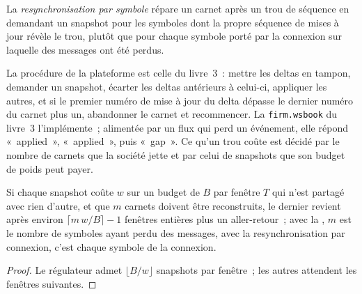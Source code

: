 \begin{definition}\label{def:nw:api-engineering-for-crypto-venues:resync}
La \emph{resynchronisation par symbole} répare un carnet après un trou de séquence en demandant un snapshot pour les symboles dont
la propre séquence de mises à jour révèle le trou, plutôt que pour chaque symbole porté par la connexion sur laquelle des messages ont été perdus.
\end{definition}

La procédure de la plateforme est celle du livre~3~: mettre les deltas en tampon, demander un snapshot, écarter les deltas antérieurs à celui-ci, appliquer les autres, et si le premier numéro de mise à jour
du delta dépasse le dernier numéro du carnet plus un, abandonner le carnet et recommencer. La \texttt{firm.wsbook} du livre~3 l'implémente~; alimentée par un flux qui perd un
événement, elle répond «~applied~», «~applied~», puis «~gap~». Ce qu'un trou coûte est décidé par le nombre de carnets que la société jette et par celui de snapshots que son
budget de poids peut payer.

\begin{proposition}\label{prop:nw:api-engineering-for-crypto-venues:gap}
Si chaque snapshot coûte $w$ sur un budget de $B$ par fenêtre $T$ qui n'est partagé avec rien d'autre, et que $m$ carnets doivent être reconstruits, le dernier revient après environ
$\lceil m\,w/B \rceil - 1$ fenêtres entières plus un aller-retour~; avec la , $m$ est le nombre de symboles ayant perdu des messages, avec
la resynchronisation par connexion, c'est chaque symbole de la connexion.
\end{proposition}

\begin{proof}
Le régulateur admet $\lfloor B/w \rfloor$ snapshots par fenêtre~; les autres attendent les fenêtres suivantes.
\end{proof}

\label{lst:nw:api-engineering-for-crypto-venues:resync}

